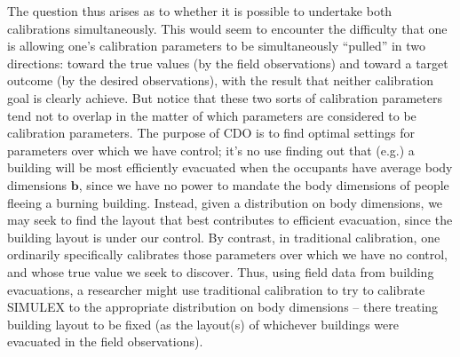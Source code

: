 \documentclass{article}
\begin{document}
The question thus arises as to whether it is possible to undertake both calibrations simultaneously. This would seem to encounter the difficulty that one is allowing one's calibration parameters to be simultaneously ``pulled'' in two directions: toward the true values (by the field observations) and toward a target outcome (by the desired observations), with the result that neither calibration goal is clearly achieve. But notice that these two sorts of calibration parameters tend not to overlap in the matter of which parameters are considered to be calibration parameters. The purpose of CDO is to find optimal settings for parameters over which we have control; it's no use finding out that (e.g.) a building will be most efficiently evacuated when the occupants have average body dimensions $\mathbf b$, since we have no power to mandate the body dimensions of people fleeing a burning building. Instead, given a distribution on body dimensions, we may seek to find the layout that best contributes to efficient evacuation, since the building layout is under our control. By contrast, in traditional calibration, one ordinarily specifically calibrates those parameters over which we have no control, and whose true value we seek to discover. Thus, using field data from building evacuations, a researcher might use traditional calibration to try to calibrate SIMULEX to the appropriate distribution on body dimensions -- there treating building layout to be fixed (as the layout(s) of whichever buildings were evacuated in the field observations).

\end{document}
